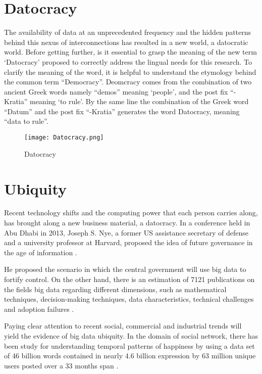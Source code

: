 \section{Datocracy}\label{sec:Datocracy}

The availability of data at an unprecedented frequency and the hidden patterns behind this nexus of interconnections has resulted in a new world, a datocratic world. Before getting further, is it essential to grasp the meaning of the new term ‘Datocracy’ proposed to correctly address the lingual needs for this research. To clarify the meaning of the word, it is helpful to understand the etymology behind the common term “Democracy”. Deomcracy comes from the combination of two ancient Greek words namely “demos” meaning ‘people’, and the post fix “-Kratia” meaning ‘to rule’. By the same line the combination of the Greek word “Datum” and the post fix “-Kratia” generates the word Datocracy, meaning “data to rule”.


\begin{figure}[h!]
    \centering
    \texttt{[image: Datocracy.png]}
    \caption{Datocracy}
    \label{fig:datocracy}
\end{figure}


\section{Ubiquity}\label{sec:Ubiquity}

Recent technology shifts and the computing power that each person carries along, has brought along a new business material, a datocracy. In a conference held in Abu Dhabi in 2013, Joseph S. Nye, a former US assistance secretary of defense and a university professor at Harvard, proposed the idea of future governance in the age of information \cite{Nye2013}.

He proposed the scenario in which the central government will use big data to fortify control. On the other hand, there is an estimation of 7121 publications on the fields big data regarding different dimensions, such as mathematical techniques, decision-making techniques, data characteristics, technical challenges and adoption failures \cite{Wang2016}.

Paying clear attention to recent social, commercial and industrial trends will yield the evidence of big data ubiquity. In the domain of social network, there has been study for understanding temporal patterns of happiness by using a data set of 46 billion words contained in nearly 4.6 billion expression by 63 million unique users posted over a 33 months span \cite{Dodds2011}.

